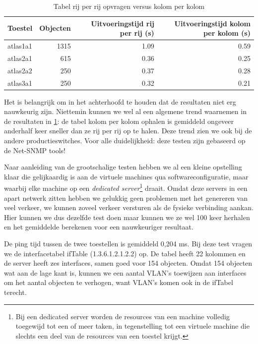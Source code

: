 
\begin{table}[h]
\centering
\begin{tabular}{@{}lrrr@{}}
\toprule
Toestel  & Objecten & Uitvoeringstijd rij per rij (s) & Uitvoeringstijd kolom per kolom (s) \\ \midrule
atlas1a1 & 1315     & 1.09                            & 0.59                                \\
atlas2a1 & 615      & 0.36                            & 0.25                                \\
atlas2a2 & 250      & 0.37                            & 0.28                                \\
atlas3a1 & 250      & 0.32                            & 0.21                                \\ \bottomrule
\end{tabular}
\caption{Tabel rij per rij opvragen versus kolom per kolom}
\label{tabel-serieel-vs-parallel}
\end{table}

Het is belangrijk om in het achterhoofd te houden dat de resultaten niet erg nauwkeurig zijn.
Niettemin kunnen we wel al een algemene trend waarnemen in de resultaten in \cref{tabel-serieel-vs-parallel}:
de tabel kolom per kolom ophalen is gemiddeld ongeveer anderhalf keer sneller dan ze rij per rij op te halen.
Deze trend zien we ook bij de andere productieswitches.
Voor alle duidelijkheid: deze testen zijn gebaseerd op de Net-SNMP tools!

Naar aanleiding van de grootschalige testen hebben we al een kleine opstelling klaar die gelijkaardig is aan de virtuele machines qua softwareconfiguratie,
maar waarbij elke machine op een \textit{dedicated server}\footnote{
	Bij een dedicated server worden de resources van een machine volledig toegewijd tot een of meer taken,
	in tegenstelling tot een virtuele machine die slechts een deel van de resources van een toestel krijgt.
} draait.
Omdat deze servers in een apart netwerk zitten hebben we gelukkig geen problemen met het genereren van veel verkeer,
we kunnen zoveel verkeer versturen als de fysieke verbinding aankan.
Hier kunnen we dus dezelfde test doen maar kunnen we ze wel 100 keer herhalen en het gemiddelde berekenen voor een nauwkeuriger resultaat.

De ping tijd tussen de twee toestellen is gemiddeld 0,204 ms.
Bij deze test vragen we de interfacetabel ifTable (1.3.6.1.2.1.2.2) op.
De tabel heeft 22 kolommen en de server heeft zes interfaces, samen goed voor 154 objecten.
Omdat 154 objecten wat aan de lage kant is,
kunnen we een aantal VLAN's toewijzen aan interfaces om het aantal objecten te verhogen,
want VLAN's komen ook in de ifTabel terecht.

